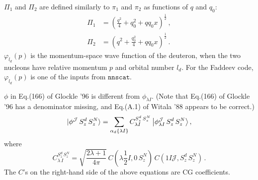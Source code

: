 \documentclass[11pt,aps]{revtex4}
\newcommand{\orig}[1]{{\color{red} #1 }}
\begin{document}
$\Pi_1$ and $\Pi_2$ are defined similarly to $\pi_1$ and $\pi_2$ as functions of $q$ and $q_0$:
\begin{equation}
\begin{split}
  \Pi_1 &= \left(\frac{q^2}{4} + q_0^2 + q q_0 x \right)^{\frac{1}{2}} \, ,\\
  \Pi_2 &= \left(q^2 + \frac{q_0^2}{4} + q q_0 x \right)^{\frac{1}{2}} \, .
\end{split}
\end{equation}
 $\varphi_{l_d}(p)$ is the momentum-space wave function of the deuteron, when the two nucleons have relative momentum $p$ and orbital number $l_d$. For the Faddeev code, $\varphi_{l_d}(p)$ is one of the inputs from $\texttt{nnscat}$.

$\phi$ in Eq.(166) of Glockle '96 is different from $\phi_{\lambda I}$. (Note that Eq.(166) of Glockle '96 has a denominator missing, and Eq.(A.1) of Witala '88 appears to be correct.)
\begin{equation}
  | \phi^\mathcal{J}\, S_z^d\, S_z^N \rangle = \sum_{\alpha_d\{\lambda I\}} C_{\lambda I}^{S_z^d\, S_z^N}\, \big{|}\phi^\mathcal{J}_{\lambda I}\, S_z^d\, S_z^N \big{\rangle} \, ,
\end{equation}
where
\begin{equation}
  C_{\lambda\, I}^{S_z^d\, S_z^N} = \sqrt{\frac{2\lambda + 1}{4\pi}}\,
   C(\lambda \frac{1}{2} I, 0\, S_z^N)\, C(1I\mathcal{J}, S_z^d\, S_z^N) \, . \label{eqn-CCC}
\end{equation}
The $C$'s on the right-hand side of the above equations are CG coefficients.

\end{document}
